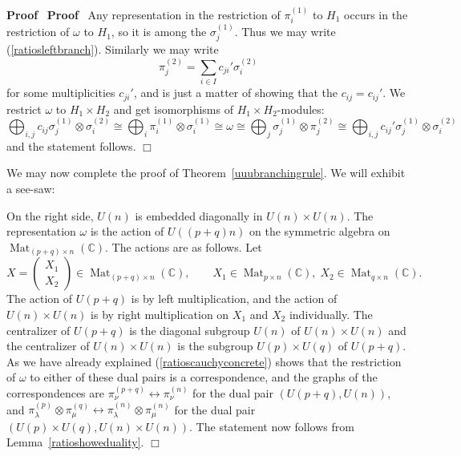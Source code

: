 \documentclass[11pt]{amsart}
\newcommand{\tmop}[1]{\ensuremath{\operatorname{#1}}}
\renewenvironment{proof}{
\noindent\textbf{Proof}\ }{\hspace*{\fill}
\begin{math}\Box\end{math}\medskip}
\begin{document}
\begin{proof}
\begin{proof}
   Any representation in the restriction of $\pi_i^{( 1 )}$ to $H_1$ occurs
   in the restriction of $\omega$ to $H_1$, so it is among the $\sigma_j^{( 1
   )}$. Thus we may write (\ref{ratiosleftbranch}). Similarly we may write
   \[ \pi_j^{( 2 )} = \sum_{i \in I} c_{j i}' \sigma_i^{( 2 )} \]
   for some multiplicities $c_{j i}'$, and is just a matter of showing that
   the $c_{i j} = c_{i j}'$. We restrict $\omega$ to $H_1 \times H_2$ and get
   isomorphisms of $H_1 \times H_2$-modules:
   \[ \bigoplus_{i, j} c_{i j} \sigma_j^{( 1 )} \otimes \sigma_i^{( 2 )}
      \cong \bigoplus_i \pi_i^{( 1 )} \otimes \sigma_i^{( 1 )} \cong \omega
      \cong \bigoplus_j \sigma_j^{( 1 )} \otimes \pi_j^{( 2 )} \cong
      \bigoplus_{i, j} c_{i j}' \sigma_j^{( 1 )} \otimes \sigma_i^{( 2 )} \]
   and the statement follows.
\end{proof}

We may now complete the proof of Theorem~\ref{uuubranchingrule}.
We will exhibit a see-saw:



{\hspace*{\fill}}  {\hspace*{\fill}}



On the right side, $U ( n )$ is embedded diagonally in $U ( n )
\times U ( n )$. The representation $\omega$ is the action of $U (
( p + q ) n )$ on the symmetric algebra on $\tmop{Mat}_{( p + q )
\times n} (\mathbb{C})$. The actions are as follows. Let
\[ X = \left(\begin{array}{c}
      X_1\\
      X_2
    \end{array}\right) \in \tmop{Mat}_{( p + q ) \times n} (\mathbb{C}),
    \hspace{2em} X_1 \in \tmop{Mat}_{p \times n} (\mathbb{C}), \; X_2 \in
    \tmop{Mat}_{q \times n} (\mathbb{C}) . \]
The action of $U ( p + q )$ is by left multiplication, and the
action of $U ( n ) \times U ( n )$  is by right multiplication on
$X_1$ and $X_2$ individually. The centralizer of $U ( p + q )$ is
the diagonal subgroup $U ( n )$ of $U ( n ) \times U ( n )$ and
the centralizer of $U ( n ) \times U ( n )$ is the subgroup $U ( p
) \times U ( q )$ of $U ( p + q )$. As we have already explained
(\ref{ratioscauchyconcrete}) shows that the restriction of
$\omega$ to either of these dual pairs is a correspondence, and
the graphs of the correspondences are $\pi_{\nu}^{( p + q )}
\longleftrightarrow \pi_{\nu}^{( n )}$ for the dual pair $( U ( p
+ q ), U ( n ) )$, and $\pi_{\lambda}^{( p )} \otimes \pi_{\mu}^{(
q )} \longleftrightarrow \pi_{\lambda}^{( n )} \otimes
\pi_{\mu}^{( n )}$ for the dual pair $( U ( p ) \times U ( q ), U
( n ) \times U ( n ) )$. The statement now follows from
Lemma~\ref{ratioshoweduality}.{\hspace*{\fill}}
\end{proof}
\end{document}
